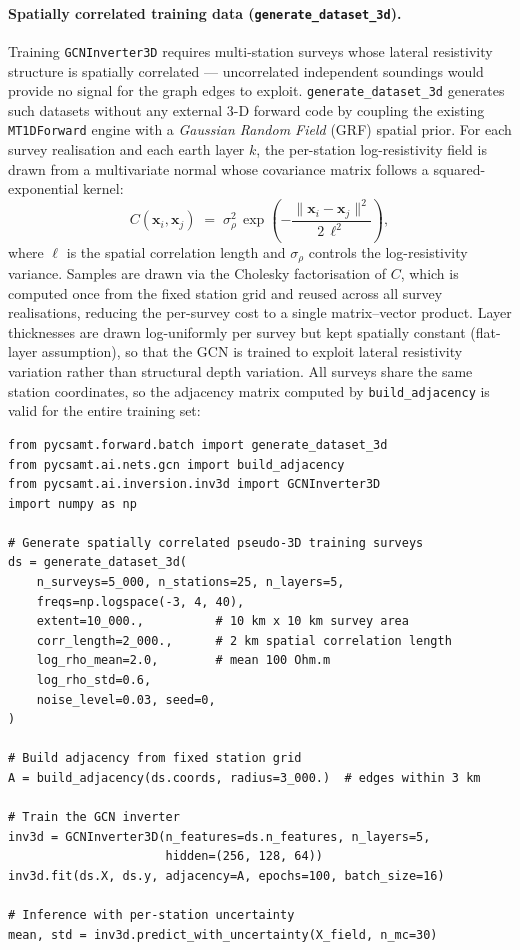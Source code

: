 \documentclass[review,12pt]{elsarticle}
\begin{document}
\paragraph{Spatially correlated training data (\texttt{generate\_dataset\_3d}).}
Training \texttt{GCNInverter3D} requires multi-station surveys whose
lateral resistivity structure is spatially correlated — uncorrelated
independent soundings would provide no signal for the graph edges to
exploit.
\texttt{generate\_dataset\_3d} generates such datasets without any
external 3-D forward code by coupling the existing \texttt{MT1DForward}
engine with a \emph{Gaussian Random Field} (GRF) spatial prior.
For each survey realisation and each earth layer $k$, the per-station
log-resistivity field is drawn from a multivariate normal whose
covariance matrix follows a squared-exponential kernel:
\begin{equation}
  C(\mathbf{x}_i, \mathbf{x}_j) \;=\;
    \sigma_\rho^2\,
    \exp\!\left(-\frac{\|\mathbf{x}_i - \mathbf{x}_j\|^2}
                      {2\,\ell^2}\right),
  \label{eq:grf}
\end{equation}
where $\ell$ is the spatial correlation length and $\sigma_\rho$ controls
the log-resistivity variance.
Samples are drawn via the Cholesky factorisation of $C$, which is
computed once from the fixed station grid and reused across all survey
realisations, reducing the per-survey cost to a single matrix–vector
product.
Layer thicknesses are drawn log-uniformly per survey but kept spatially
constant (flat-layer assumption), so that the GCN is trained to exploit
lateral resistivity variation rather than structural depth variation.
All surveys share the same station coordinates, so the adjacency
matrix computed by \texttt{build\_adjacency} is valid for the
entire training set:

\begin{lstlisting}[style=pycode, caption={Generating a pseudo-3D training set and fitting \texttt{GCNInverter3D}.}]
from pycsamt.forward.batch import generate_dataset_3d
from pycsamt.ai.nets.gcn import build_adjacency
from pycsamt.ai.inversion.inv3d import GCNInverter3D
import numpy as np

# Generate spatially correlated pseudo-3D training surveys
ds = generate_dataset_3d(
    n_surveys=5_000, n_stations=25, n_layers=5,
    freqs=np.logspace(-3, 4, 40),
    extent=10_000.,          # 10 km x 10 km survey area
    corr_length=2_000.,      # 2 km spatial correlation length
    log_rho_mean=2.0,        # mean 100 Ohm.m
    log_rho_std=0.6,
    noise_level=0.03, seed=0,
)

# Build adjacency from fixed station grid
A = build_adjacency(ds.coords, radius=3_000.)  # edges within 3 km

# Train the GCN inverter
inv3d = GCNInverter3D(n_features=ds.n_features, n_layers=5,
                      hidden=(256, 128, 64))
inv3d.fit(ds.X, ds.y, adjacency=A, epochs=100, batch_size=16)

# Inference with per-station uncertainty
mean, std = inv3d.predict_with_uncertainty(X_field, n_mc=30)
\end{lstlisting}
\end{document}
